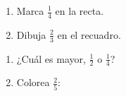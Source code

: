 \begin{wbpractice}
\begin{enumerate}
\item Marca $\frac{1}{4}$ en la recta. 
\item Dibuja $\frac{2}{3}$ en el recuadro. \wbbox[2.5cm]
\end{enumerate}
\end{wbpractice}

\begin{wbreview}
\begin{enumerate}
\item ¿Cuál es mayor, $\frac{1}{2}$ o $\frac{1}{4}$? \wbblank
\item Colorea $\frac{2}{5}$: 
\end{enumerate}
\end{wbreview}
